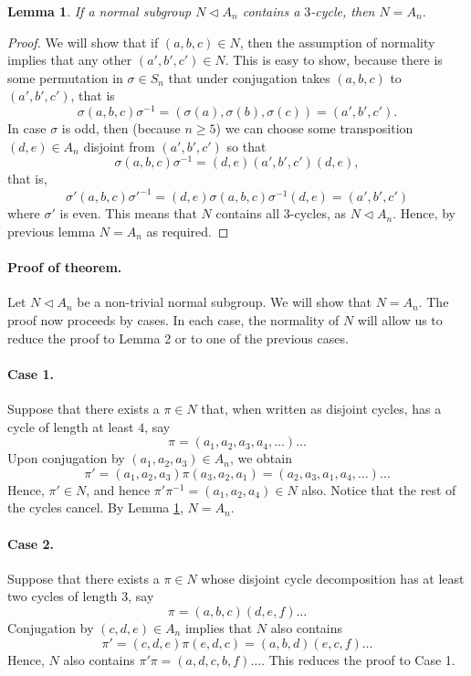 \documentclass[12pt]{article}
\newtheorem{lemma}[theorem]{Lemma}
\begin{document}
\begin{lemma}
\label{FirstLemma}
If a normal subgroup $N \triangleleft A_n$ contains a $3$-cycle, then
$N = A_n$.
\end{lemma}
\begin{proof}
We will show that if $(a,b,c) \in N$, then the assumption of normality implies that any other $(a',b',c') \in N$.  This is easy to show, because there is some permutation in $\sigma \in S_n$ that under conjugation takes $(a,b,c)$ to $(a',b',c')$, that is
\[
\sigma (a,b,c) \sigma^{-1} = (\sigma(a), \sigma(b), \sigma(c)) = (a',b',c').
\]
In case $\sigma$ is odd, then (because $n \geq 5$) we can choose some transposition $(d,e) \in A_n$ disjoint from $(a',b',c')$ so that
\[
\sigma (a,b,c) \sigma^{-1} =  (d,e)(a',b',c')(d,e),
\]
that is,
\[
\sigma' (a,b,c) \sigma'^{-1} = (d,e)\sigma (a,b,c) \sigma^{-1}(d,e) = (a',b',c')
\]
where $\sigma'$ is even.  This means that $N$ contains all $3$-cycles,
as $N \triangleleft A_n$. Hence, by previous lemma $N = A_n$ as
required.
\end{proof}

\paragraph{Proof of theorem.}
  Let $N \triangleleft A_n$ be a non-trivial normal subgroup.  We will
  show that $N = A_n$.  The proof now proceeds by cases.  In each
  case, the normality of $N$ will allow us to reduce the proof to
  Lemma 2 or to one of the previous cases.

\paragraph{Case 1.}
Suppose that there exists a $\pi\in N$ that, when written as disjoint
cycles, has a cycle of length at least $4$, say
\[
\pi = (a_1, a_2, a_3, a_4, \ldots)\ldots
\]
Upon conjugation by $(a_1, a_2, a_3) \in A_n$, we obtain
\[
\pi' = (a_1, a_2, a_3) \pi (a_3, a_2, a_1) = (a_2, a_3, a_1, a_4,
\ldots) \ldots
\]
Hence, $\pi' \in N$, and hence $\pi' \pi^{-1} = (a_1, a_2, a_4) \in N$
also.  Notice that the rest of the cycles cancel.  By Lemma
\ref{FirstLemma}, $N = A_n$.

\paragraph{Case 2.}
Suppose that there exists a $\pi \in N$ whose disjoint cycle
decomposition has at least two cycles of length 3, say
\[ \pi = (a,b,c)(d,e,f) \ldots \] Conjugation by $(c,d,e)\in A_n$
implies that $N$ also contains
\[
\pi' = (c,d,e)\pi(e,d,c) = (a,b,d)(e,c,f)\ldots
\]
Hence, $N$ also contains $\pi' \pi = (a,d,c,b,f)\ldots$. This reduces
the proof to Case 1.
\end{document}

